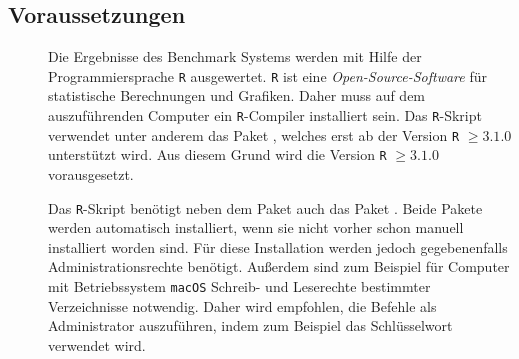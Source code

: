\subsection{Voraussetzungen}

\begin{description}
	\item[] Die Ergebnisse des Benchmark Systems werden mit Hilfe der Programmiersprache \texttt{R} ausgewertet. \texttt{R} ist eine \emph{Open-Source-Software} für statistische Berechnungen und Grafiken. Daher muss auf dem auszuführenden Computer ein \texttt{R}-Compiler installiert sein\cite{r-project}. Das \texttt{R}-Skript verwendet unter anderem das Paket , welches erst ab der Version \texttt{R} $\geq 3.1.0$ unterstützt wird\cite{rjson}. Aus diesem Grund wird die Version \texttt{R} $\geq 3.1.0$ vorausgesetzt.
	\item[] Das \texttt{R}-Skript benötigt neben dem Paket  auch das Paket  \cite{rcolorbrewer}. Beide Pakete werden automatisch installiert, wenn sie nicht vorher schon manuell installiert worden sind. Für diese Installation werden jedoch gegebenenfalls Administrationsrechte benötigt. Außerdem sind zum Beispiel für Computer mit Betriebssystem \texttt{macOS} Schreib- und Leserechte bestimmter Verzeichnisse notwendig. Daher wird empfohlen, die Befehle als Administrator auszuführen, indem zum Beispiel das Schlüsselwort  verwendet wird.
\end{description}
